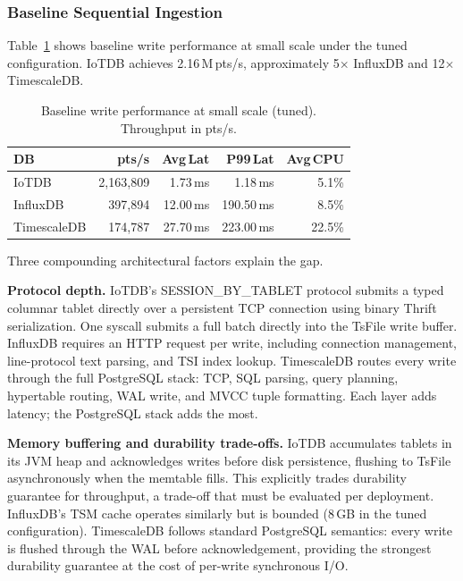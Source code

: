\subsubsection{Baseline Sequential Ingestion}

Table~\ref{tab:write-baseline} shows baseline write performance at small scale under the tuned
configuration. IoTDB achieves 2.16\,M\,pts/s, approximately 5$\times$ InfluxDB and 12$\times$
TimescaleDB.

\begin{table}[t]
  \centering
  \caption{Baseline write performance at small scale (tuned). Throughput in pts/s.}
  \label{tab:write-baseline}
  \begin{tabular}{lrrrr}
    \hline
    \textbf{DB} & \textbf{pts/s} & \textbf{Avg\,Lat} & \textbf{P99\,Lat} & \textbf{Avg\,CPU} \\
    \hline
    IoTDB       & 2{,}163{,}809 &  1.73\,ms &   1.18\,ms &  5.1\% \\
    InfluxDB    &   397{,}894   & 12.00\,ms & 190.50\,ms &  8.5\% \\
    TimescaleDB &   174{,}787   & 27.70\,ms & 223.00\,ms & 22.5\% \\
    \hline
  \end{tabular}
\end{table}

Three compounding architectural factors explain the gap.

\textbf{Protocol depth.} IoTDB's SESSION\_BY\_TABLET protocol submits a typed columnar
tablet directly over a persistent TCP connection using binary Thrift serialization. One
syscall submits a full batch directly into the TsFile write buffer. InfluxDB requires an
HTTP request per write, including connection management, line-protocol text parsing, and
TSI index lookup. TimescaleDB routes every write through the full PostgreSQL stack:
TCP, SQL parsing, query planning, hypertable routing, WAL write, and MVCC tuple formatting.
Each layer adds latency; the PostgreSQL stack adds the most.

\textbf{Memory buffering and durability trade-offs.} IoTDB accumulates tablets in its
JVM heap and acknowledges writes before disk persistence, flushing to TsFile asynchronously
when the memtable fills. This explicitly trades durability guarantee for throughput, a
trade-off that must be evaluated per deployment. InfluxDB's TSM cache operates similarly
but is bounded (8\,GB in the tuned configuration). TimescaleDB follows standard PostgreSQL
semantics: every write is flushed through the WAL before acknowledgement, providing the
strongest durability guarantee at the cost of per-write synchronous I/O.


